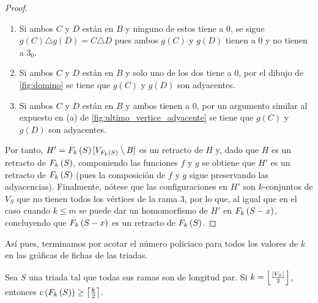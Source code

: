 \begin{proof}
\begin{enumerate}
        \item Si ambos $C$ y $D$ est\'an en $B$ y ninguno de estos tiene a $0$,
        se sigue $g(C)\triangle g(D) = C\triangle D$ pues ambos $g(C)$ y $g(D)$
        tienen a $0$ y no tienen a $3_0$.

        \item Si ambos $C$ y $D$ est\'an en $B$ y solo uno de los dos tiene a
        $0$, por el dibujo de \cref{fig:domino} se tiene que $g(C)$ y $g(D)$ son
        adyacentes.

        \item Si ambos $C$ y $D$ est\'an en $B$ y ambos tienen a $0$, por un
        argumento similar al expuesto en (a) de
        \cref{fig:ultimo_vertice_adyacente} se tiene que $g(C)$ y $g(D)$ son
        adyacentes.
    
    \end{enumerate}

    \newpage

    Por tanto, $H'=F_{k}\left( S\right)[V_{F_{k}\left( S\right)}\setminus B]$ es un retracto de $H$ y,
    dado que $H$ es un retracto de $F_{k}\left( S\right)$, componiendo las funciones $f$ y
    $g$ se obtiene que $H'$ es un retracto de $F_{k}\left( S\right)$ (pues la composici\'on
    de $f$ y $g$ sigue preservando las adyacencias). Finalmente, n\'otese que
    las configuraciones en $H'$ son $k$-conjuntos de $V_S$ que no tienen todos
    los v\'ertices de la rama $3$, por lo que, al igual que en el caso cuando
    $k\leq m$ se puede dar un homomorfismo de $H'$ en $F_{k}\left( S-x\right)$, concluyendo
    que $F_{k}\left( S-x\right)$ es un retracto de $F_{k}\left( S\right)$.

\end{proof}

As\'i pues, terminamos por acotar el n\'umero policiaco para todos los valores
de $k$ en las gr\'aficas de fichas de las triadas.

\begin{lema}
\label{lem:k-especial-triada}
    Sea $S$ una triada tal que todas sus ramas son de longitud par. Si
    $k=\left\lfloor \frac{\left|V_S\right|}{2}\right\rfloor$, entonces
    $c\left( F_{k}\left( S\right)\right)\geq \left\lceil\frac{k}{2}\right\rceil$.
\end{lema}

